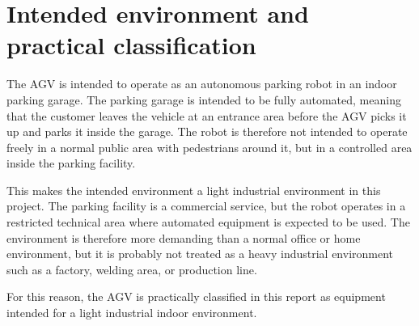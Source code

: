 \section{Intended environment and practical classification}
The AGV is intended to operate as an autonomous parking robot in an indoor parking
garage. The parking garage is intended to be fully automated, meaning that the customer
leaves the vehicle at an entrance area before the AGV picks it up and parks it inside the
garage. The robot is therefore not intended to operate freely in a normal public area with
pedestrians around it, but in a controlled area inside the parking facility.

This makes the intended environment a light industrial environment in this project. The
parking facility is a commercial service, but the robot operates in a restricted technical
area where automated equipment is expected to be used. The environment is therefore more
demanding than a normal office or home environment, but it is probably not treated as a
heavy industrial environment such as a factory, welding area, or production line.

For this reason, the AGV is practically classified in this report as equipment intended for
a light industrial indoor environment.